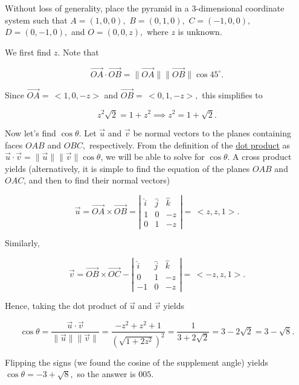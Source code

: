 \begin{enumerate}
Without loss of generality, place the pyramid in a 3-dimensional coordinate system such that $A = (1,0,0),$ $B = (0,1,0),$ $C = ( - 1,0,0),$ $D = (0, - 1,0),$ and $O = (0,0,z),$ where $z$ is unknown.

 We first find $z.$ Note that

 
 \[\overrightarrow{OA}\cdot \overrightarrow{OB} = \parallel \overrightarrow{OA}\parallel \parallel \overrightarrow{OB}\parallel \cos 45^\circ.\]

 Since $\overrightarrow{OA} =\, <1,0, - z>$ and $\overrightarrow{OB} =\, <0,1, - z> ,$ this simplifies to

 
 \[z^{2}\sqrt {2} = 1 + z^{2}\implies z^{2} = 1 + \sqrt {2}.\]

 Now let's find $\cos \theta.$ Let $\vec{u}$ and $\vec{v}$ be normal vectors to the planes containing faces $OAB$ and $OBC,$ respectively. From the definition of the \href{https://artofproblemsolving.com/wiki/index.php?title=Dot\_product}{dot product} as $\vec{u}\cdot \vec{v} = \parallel \vec{u}\parallel \parallel \vec{v}\parallel \cos \theta$, we will be able to solve for $\cos \theta.$ A cross product yields (alternatively, it is simple to find the equation of the planes $OAB$ and $OAC$, and then to find their normal vectors)

 
 \[\vec{u} = \overrightarrow{OA}\times \overrightarrow{OB} = \left| \begin{array}{ccc}\hat{i} & \hat{j} & \hat{k} \\ 1 & 0 & - z \\ 0 & 1 & - z \end{array}\right| =\, < z,z,1 > .\]

 Similarly,

 
 \[\vec{v} = \overrightarrow{OB}\times \overrightarrow{OC} - \left|\begin{array}{ccc}\hat{i} & \hat{j} & \hat{k} \\ 0 & 1 & - z \\ - 1 & 0 & - z \end{array}\right| =\, < - z,z,1 > .\]

 Hence, taking the dot product of $\vec{u}$ and $\vec{v}$ yields

 
 \[\cos \theta = \frac{ \vec{u} \cdot \vec{v} }{ \parallel \vec{u} \parallel \parallel \vec{v} \parallel } = \frac{- z^{2} + z^{2} + 1}{(\sqrt {1 + 2z^{2}})^{2}} =  \frac {1}{3 + 2\sqrt {2}} = 3 - 2\sqrt {2} = 3 - \sqrt {8}.\]

 Flipping the signs (we found the cosine of the supplement angle) yields $\cos \theta = - 3 + \sqrt {8},$ so the answer is $\boxed{005}$.


\end{enumerate}
